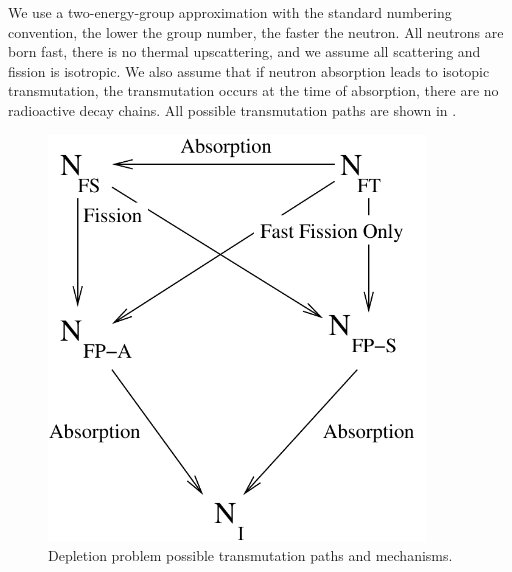 We use a two-energy-group approximation with the standard numbering convention, the lower the group number, the faster the neutron.  
All neutrons are born fast, there is no thermal upscattering, and we assume all scattering and fission is isotropic.
We also assume that if neutron absorption leads to isotopic transmutation, the transmutation occurs at the time of absorption, there are no radioactive decay chains.
All possible transmutation paths are shown in .
\begin{figure}[!htp]
\begin{center}
\includegraphics[width=10cm]{chapter5_depletion/article_transmutation.pdf}
\end{center}
\caption{Depletion problem possible transmutation paths and mechanisms.}
\label{fig:transmutation}
\end{figure}


